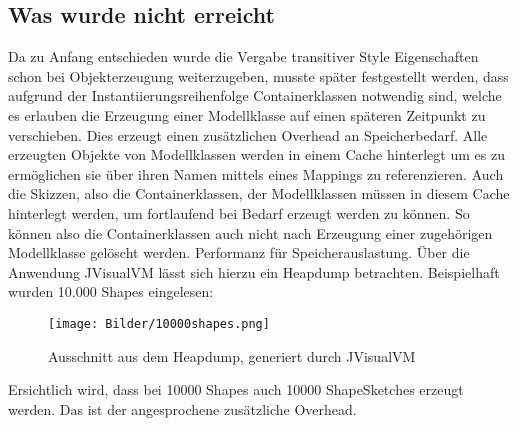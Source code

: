 \subsection{Was wurde nicht erreicht}
Da zu Anfang entschieden wurde die Vergabe transitiver Style Eigenschaften schon bei Objekterzeugung weiterzugeben, musste später festgestellt werden, dass aufgrund der Instantiierungsreihenfolge Containerklassen notwendig sind, welche es erlauben die Erzeugung einer Modellklasse auf einen späteren Zeitpunkt zu verschieben. Dies erzeugt einen zusätzlichen Overhead an Speicherbedarf. Alle erzeugten Objekte von Modellklassen werden in einem Cache hinterlegt um es zu ermöglichen sie über ihren Namen mittels eines Mappings zu referenzieren. Auch die Skizzen, also die Containerklassen, der Modellklassen müssen in diesem Cache hinterlegt werden, um fortlaufend bei Bedarf erzeugt werden zu können. So können also die Containerklassen auch nicht nach Erzeugung einer zugehörigen Modellklasse gelöscht werden. Performanz für Speicherauslastung.
Über die Anwendung JVisualVM\cite{jvisualvm} lässt sich hierzu ein Heapdump betrachten. Beispielhaft wurden 10.000 Shapes eingelesen:
\begin{figure}[h]
	\begin{center}
		\texttt{[image: Bilder/10000shapes.png]}
		\caption{Ausschnitt aus dem Heapdump, generiert durch JVisualVM}
		\label{jvisualvm}
	\end{center}
\end{figure}Ersichtlich wird, dass bei 10000 Shapes auch 10000 ShapeSketches erzeugt werden. Das ist der angesprochene zusätzliche Overhead.
